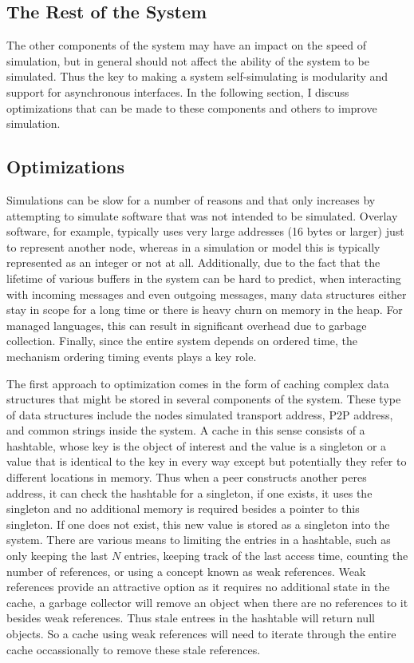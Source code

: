 \subsection{The Rest of the System}

The other components of the system may have an impact on the speed of
simulation, but in general should not affect the ability of the system to be
simulated.  Thus the key to making a system self-simulating is modularity and
support for asynchronous interfaces.  In the following section, I discuss
optimizations that can be made to these components and others to improve
simulation.

\subsection{Optimizations}

Simulations can be slow for a number of reasons and that only increases by
attempting to simulate software that was not intended to be simulated.  Overlay
software, for example, typically uses very large addresses (16 bytes or larger)
just to represent another node, whereas in a simulation or model this is
typically represented as an integer or not at all.  Additionally, due to the
fact that the lifetime of various buffers in the system can be hard to predict,
when interacting with incoming messages and even outgoing messages, many data
structures either stay in scope for a long time or there is heavy churn on
memory in the heap.  For managed languages, this can result in significant
overhead due to garbage collection.  Finally, since the entire system depends
on ordered time, the mechanism ordering timing events plays a key role.

The first approach to optimization comes in the form of caching complex data
structures that might be stored in several components of the system.  These
type of data structures include the nodes simulated transport address, P2P
address, and common strings inside the system.  A cache in this sense consists
of a hashtable, whose key is the object of interest and the value is a
singleton or a value that is identical to the key in every way except but
potentially they refer to different locations in memory.  Thus when a peer
constructs another peres address, it can check the hashtable for a singleton,
if one exists, it uses the singleton and no additional memory is required
besides a pointer to this singleton.  If one does not exist, this new value is
stored as a singleton into the system.  There are various means to limiting the
entries in a hashtable, such as only keeping the last $N$ entries, keeping
track of the last access time, counting the number of references, or using a
concept known as weak references.  Weak references provide an attractive option
as it requires no additional state in the cache, a garbage collector will
remove an object when there are no references to it besides weak references.
Thus stale entrees in the hashtable will return null objects.  So a cache using
weak references will need to iterate through the entire cache occassionally to
remove these stale references.

